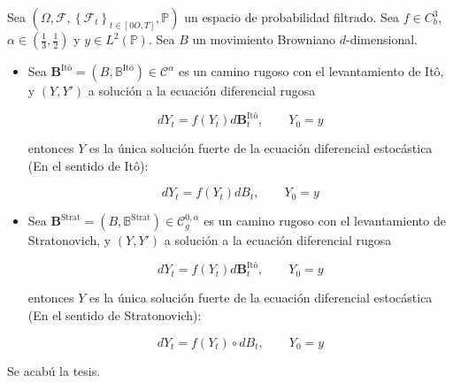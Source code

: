 \begin{prop}
	Sea $(\Omega, \mathcal{F}, \left\{ \mathcal{F}_t \right\}_{t \in [0O,T]}, \mathbb{P}  )$ un espacio de probabilidad filtrado. Sea $f \in C^3_b$, $\alpha \in \left( \frac{1}{3}, \frac{1}{2} \right)$ y $y \in L^2 (\mathbb{P})$. Sea $B$ un movimiento Browniano $d$-dimensional.

	\begin{itemize}
		\item Sea $\mathbf{B}^{\text{Itô}} = (B, \mathbb{B}^{\text{Itô}}) \in \mathscr{C}^{\alpha}$ es un camino rugoso con el levantamiento de Itô, y $(Y, Y')$ a solución a la ecuación diferencial rugosa

		\[
			dY_t = f(Y_t) d\mathbf{B}^{\text{Itô}}_t, \qquad Y_0 = y	
		\]

		entonces $Y$ es la única solución fuerte de la ecuación diferencial estocástica (En el sentido de Itô):

		\[
			dY_t = f(Y_t) dB_t, \qquad Y_0 = y
		\]

		\item Sea $\mathbf{B}^{\text{Strat}} = (B, \mathbb{B}^{\text{Strat}}) \in \mathscr{C}^{0, \alpha}_g$ es un camino rugoso con el levantamiento de Stratonovich, y $(Y, Y')$ a solución a la ecuación diferencial rugosa

		\[
			dY_t = f(Y_t) d\mathbf{B}^{\text{Itô}}_t, \qquad Y_0 = y	
		\]

		entonces $Y$ es la única solución fuerte de la ecuación diferencial estocástica (En el sentido de Stratonovich):

		\[
			dY_t = f(Y_t) \circ dB_t, \qquad Y_0 = y
		\]

	\end{itemize}

\end{prop}

Se acabú la tesis.